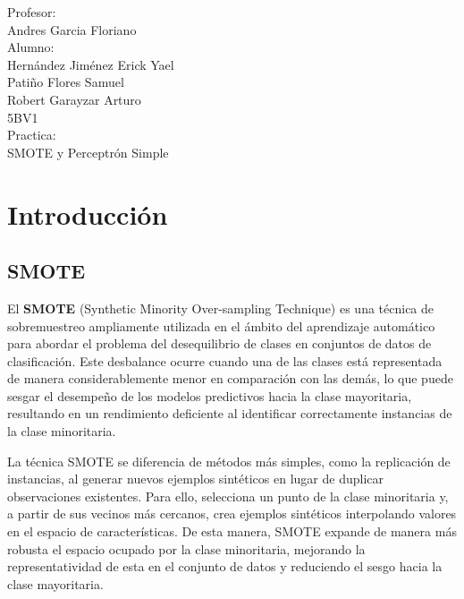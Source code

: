 \documentclass{article}
\begin{document}
\begin{titlepage}
\begin{spacing}{2}
\begin{center}
{{{                        Profesor:  \\  Andres Garcia Floriano \\
                        Alumno: \\ Hernández Jiménez Erick Yael \\ Patiño Flores Samuel \\ Robert Garayzar Arturo \\ 
                        5BV1 \\ 
                        Practica:  \\ SMOTE y Perceptrón Simple }}}
        \end{center}
        \end{spacing}       
    \end{titlepage}
    
    \pagestyle{fancy}
    \fancyhf{}
    \fancyfoot[C]{\thepage} 
    \renewcommand{\headrulewidth}{0pt} 
    \newpage
    \tableofcontents
    \newpage
    \section{Introducción}
    \subsection{SMOTE}
    El \textbf{SMOTE} (Synthetic Minority Over-sampling Technique) es una técnica de sobremuestreo ampliamente utilizada en el ámbito del aprendizaje automático para abordar el problema del desequilibrio de clases en conjuntos de datos de clasificación. Este desbalance ocurre cuando una de las clases está representada de manera considerablemente menor en comparación con las demás, lo que puede sesgar el desempeño de los modelos predictivos hacia la clase mayoritaria, resultando en un rendimiento deficiente al identificar correctamente instancias de la clase minoritaria.

    La técnica SMOTE se diferencia de métodos más simples, como la replicación de instancias, al generar nuevos ejemplos sintéticos en lugar de duplicar observaciones existentes. Para ello, selecciona un punto de la clase minoritaria y, a partir de sus vecinos más cercanos, crea ejemplos sintéticos interpolando valores en el espacio de características. De esta manera, SMOTE expande de manera más robusta el espacio ocupado por la clase minoritaria, mejorando la representatividad de esta en el conjunto de datos y reduciendo el sesgo hacia la clase mayoritaria.
    
\end{document}
